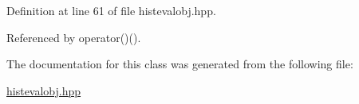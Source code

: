 \-Definition at line 61 of file histevalobj.\-hpp.



\-Referenced by operator()().



\-The documentation for this class was generated from the following file\-:\begin{DoxyCompactItemize}
\item 
\hyperlink{histevalobj_8hpp}{histevalobj.\-hpp}\end{DoxyCompactItemize}

